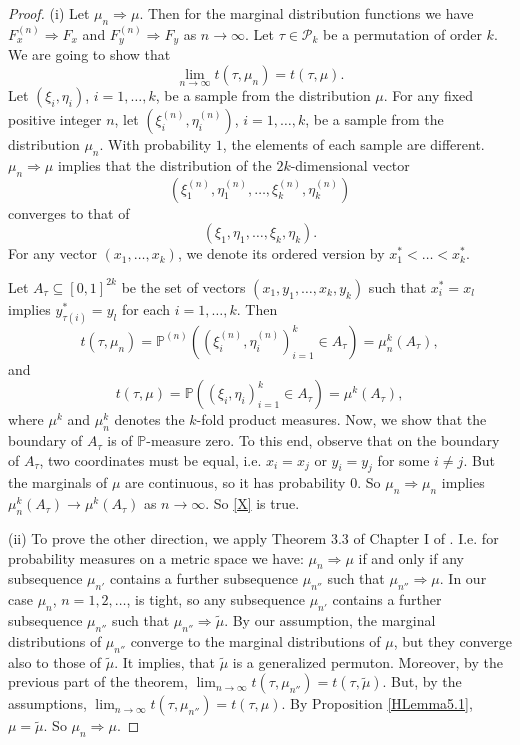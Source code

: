 \documentclass[12pt,twoside]{article}
\theoremstyle{definition}
\theoremstyle{remark}
\numberwithin{equation}{section}
\theoremstyle{plain}
\theoremstyle{remark}
\def\P{{\mathbb {P}}}                       \def\Q{{\mathbb {Q}}}
\def\PD{{\mathcal P}}                     \def\PDW{{\tilde{\cal P}}}
\def\PD{{\mathcal P}}
\begin{document}
\begin{proof}
(i)
Let $\mu_n \Rightarrow \mu$.
Then for the marginal distribution functions we have $F^{(n)}_x \Rightarrow F_x$ and 
$F^{(n)}_y \Rightarrow F_y$ as $n\to \infty$.
Let $\tau\in \PD_k$ be a permutation of order $k$.
We are going to show that
\begin{equation}  \label{X}
\lim_{n\to \infty} t(\tau, \mu_n) = t(\tau, \mu).
\end{equation}
Let $(\xi_i, \eta_i)$, $i=1, \dots , k$, be a sample from the distribution $\mu$. 
For any fixed positive integer $n$,
let $(\xi^{(n)}_i, \eta^{(n)}_i)$, $i=1, \dots , k$, be a sample from the distribution $\mu_n$.
With probability $1$, the elements of each sample are different.
 $\mu_n \Rightarrow \mu$ implies that the distribution of the $2k$-dimensional vector
 $$
 (\xi^{(n)}_1, \eta^{(n)}_1,\dots , \xi^{(n)}_k, \eta^{(n)}_k)
 $$
 converges to that of
 $$
 (\xi_1, \eta_1,\dots , \xi_k, \eta_k).
 $$
 For any vector $(x_1, \dots ,x_k)$, we denote its ordered version by
 $x^{\ast}_1 < \dots < x^{\ast}_k$.
 
 Let $A_\tau\subseteq [0,1]^{2k}$ be the set of vectors
 $(x_1, y_1, \dots ,x_k, y_k)$ such that
 $x^{\ast}_i = x_l$ implies $y^{\ast}_{\tau(i)} = y_l$ for each $i=1,\dots , k$.
 Then 
 \begin{equation}  \label{H47}
 t(\tau, \mu_n) = 
 \P^{(n)} \left( \left(\xi^{(n)}_i, \eta^{(n)}_i \right)_{i=1}^{k} \in A_\tau \right) =
 \mu_n^{k} (A_\tau) ,
 \end{equation} 
 and 
\begin{equation}  \label{H47+}
 t(\tau, \mu) = 
 \P\left( \left(\xi_i, \eta_i \right)_{i=1}^{k} \in A_\tau \right) =
 \mu^{k} (A_\tau) ,
 \end{equation}  
 where $\mu^{k} $ and $\mu_n^{k} $ denotes the $k$-fold product measures.
 Now, we show that the boundary of $A_\tau$ is of $\P$-measure zero.
 To this end, observe that on the boundary of $A_\tau$,
 two coordinates must be equal, i.e. $x_i=x_j$ or $y_i=y_j$ for some $i\ne j$.
 But the marginals of $\mu$ are continuous, so it has probability $0$.
 So $\mu_n \Rightarrow \mu_n$ implies $\mu_n^{k} (A_\tau) \to \mu^{k} (A_\tau)$ as 
 $n \to \infty$.
 So \eqref{X} is true.
 
 (ii)
 To prove the other direction, we apply Theorem 3.3 of Chapter I of \cite{Bill}.
 I.e. for probability measures on a metric space we have:
 $\mu_n \Rightarrow \mu$ if and only if any subsequence $\mu_{n'}$ contains a further
 subsequence $\mu_{n''}$ such that $\mu_{n''} \Rightarrow \mu$.
In our case  $\mu_n$, $n=1, 2, \dots$, is tight, so any subsequence $\mu_{n'}$ contains a further
 subsequence $\mu_{n''}$ such that $\mu_{n''} \Rightarrow \tilde{\mu}$.
 By our assumption, the marginal distributions of $\mu_{n''}$ converge to the marginal distributions of
 $\mu$, but they converge also to those of $\tilde{\mu}$.
 It implies, that $\tilde{\mu}$ is a generalized permuton.
 Moreover, by the previous part of the theorem, 
 $\lim_{n\to \infty} t(\tau, \mu_{n''}) = t(\tau, \tilde{\mu})$.
 But, by the assumptions, 
 $\lim_{n\to \infty} t(\tau, \mu_{n''}) = t(\tau, {\mu})$.
 By Proposition \ref{HLemma5.1}, $\mu = \tilde{\mu}$.
 So $\mu_n \Rightarrow \mu$.
\end{proof}
%
\end{document}
